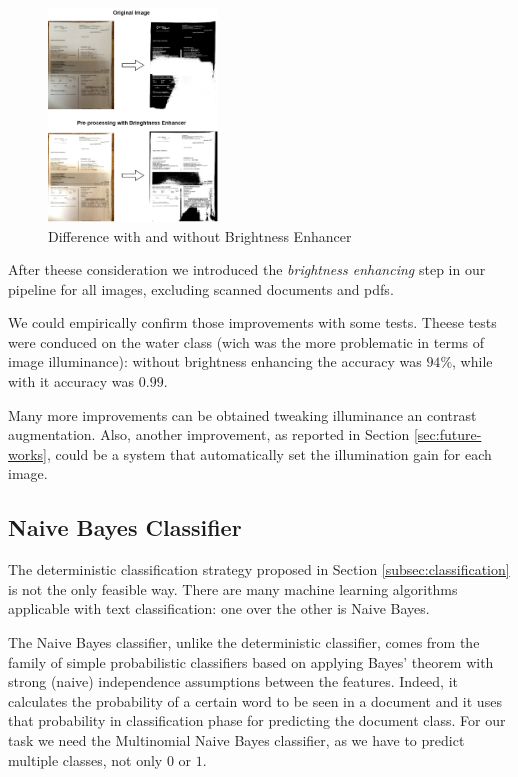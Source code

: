 \documentclass[10pt,twocolumn,letterpaper]{article}
\begin{document}
\begin{figure}[!ht]
  \centering
  \includegraphics[width=0.4\textwidth]{images/bright-contrast-experiment.png}
  \caption{Difference with and without Brightness Enhancer}
  \label{bright-constrast-experiment}
\end{figure}

After theese consideration we introduced the \emph{brightness
  enhancing} step in our pipeline for all images, excluding scanned
documents and pdfs.

We could empirically confirm those improvements with some
tests. Theese tests were conduced on the water class (wich was the
more problematic in terms of image illuminance): without brightness
enhancing the accuracy was $94\%$, while with it accuracy was $0.99$.

Many more improvements can be obtained tweaking illuminance an
contrast augmentation. Also, another improvement, as reported in
Section \ref{sec:future-works}, could be a system that automatically
set the illumination gain for each image.

\subsection{Naive Bayes Classifier}
\label{subsec:naive-bayes-classifier}

The deterministic classification strategy proposed in Section
\ref{subsec:classification} is not the only feasible way. There are
many machine learning algorithms applicable with text classification:
one over the other is Naive Bayes.

The Naive Bayes classifier, unlike the deterministic classifier, comes
from the family of simple probabilistic classifiers based on applying
Bayes' theorem with strong (naive) independence assumptions between
the features. Indeed, it calculates the probability of a certain word
to be seen in a document and it uses that probability in
classification phase for predicting the document class. For our task
we need the Multinomial Naive Bayes classifier, as we have to predict
multiple classes, not only $0$ or $1$.
\end{document}
